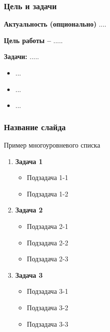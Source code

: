 \begin{frame}
\frametitle{Цель и задачи}
	\textbf{Актуальность (опционально)} ....
	
	\textbf{Цель работы --} ..... 
	
	\textbf{Задачи:} ..... 
	
   	\begin{itemize}
   		\item ...
   		\item ...
   		\item ...
   	\end{itemize}
\end{frame}



\begin{frame}
\frametitle{Название слайда}
Пример многоуровневого списка

\begin{enumerate}
  \item \textbf{Задача 1}
  \begin{itemize}
    \item Подзадача 1-1
    \item Подзадача 1-2
  \end{itemize}
  \item \textbf{Задача 2}
  \begin{itemize}
    \item Подзадача 2-1
    \item Подзадача 2-2
    \item Подзадача 2-3
  \end{itemize}
  \item \textbf{Задача 3}
  \begin{itemize}
    \item Подзадача 3-1
    \item Подзадача 3-2
    \item Подзадача 3-3
  \end{itemize}
\end{enumerate}
\end{frame}


